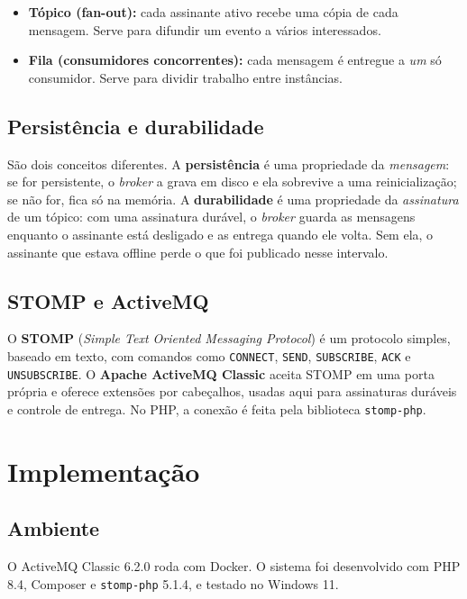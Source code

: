 \documentclass[11pt,a4paper]{article}
\begin{document}
\begin{itemize}
  \item \textbf{T\'opico (fan-out):} cada assinante ativo recebe uma c\'opia de cada
        mensagem. Serve para difundir um evento a v\'arios interessados.
  \item \textbf{Fila (consumidores concorrentes):} cada mensagem \'e entregue a
        \emph{um} s\'o consumidor. Serve para dividir trabalho entre inst\^ancias.
\end{itemize}

\subsection{Persist\^encia e durabilidade}
S\~ao dois conceitos diferentes. A \textbf{persist\^encia} \'e uma propriedade da
\emph{mensagem}: se for persistente, o \textit{broker} a grava em disco e ela sobrevive a uma reinicializa\c{c}\~ao; se n\~ao for,
fica s\'o na mem\'oria. A \textbf{durabilidade} \'e uma propriedade da \emph{assinatura}
de um t\'opico: com uma assinatura dur\'avel, o \textit{broker} guarda as mensagens
enquanto o assinante est\'a desligado e as entrega quando ele volta. Sem ela, o
assinante que estava offline perde o que foi publicado nesse intervalo.

\subsection{STOMP e ActiveMQ}
O \textbf{STOMP} (\textit{Simple Text Oriented Messaging Protocol}) \'e um
protocolo simples, baseado em texto, com comandos como \texttt{CONNECT},
\texttt{SEND}, \texttt{SUBSCRIBE}, \texttt{ACK} e \texttt{UNSUBSCRIBE}. O \textbf{Apache
ActiveMQ Classic} aceita STOMP em uma porta pr\'opria e oferece
extens\~oes por cabe\c{c}alhos, usadas aqui para assinaturas dur\'aveis e controle de
entrega. No PHP, a conex\~ao \'e feita pela biblioteca \texttt{stomp-php}.

\section{Implementa\c{c}\~ao}

\subsection{Ambiente}
O ActiveMQ Classic 6.2.0 roda com Docker. O sistema foi desenvolvido com PHP 8.4,
Composer e \texttt{stomp-php} 5.1.4, e testado no Windows 11.
\end{document}
